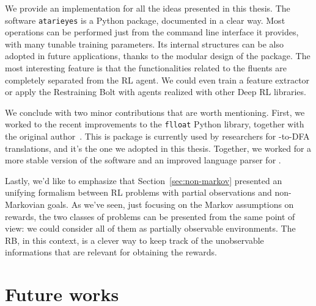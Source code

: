 \begin{description}[style=nextline]
	\item[The \texttt{atarieyes} package]
		We provide an implementation for all the ideas presented in this thesis.
		The software \texttt{atarieyes} is a Python package, documented in a clear
		way.  Most operations can be performed just from the command line
		interface it provides, with many tunable training parameters. Its internal
		structures can be also adopted in future applications, thanks to the
		modular design of the package. The most interesting feature is that the
		functionalities related to the fluents are completely separated from the
		RL agent. We could even train a feature extractor or apply the Restraining
		Bolt with agents realized with other Deep RL libraries.

\end{description}

We conclude with two minor contributions that are worth mentioning. First, we
worked to the recent improvements to the \texttt{flloat} Python library,
together with the original author~\cite{bib:favorito-thesis}. This is package
is currently used by researchers for \ldl{}-to-DFA translations, and it's the
one we adopted in this thesis. Together, we worked for a more stable version
of the software and an improved language parser for \ldl{}.

Lastly, we'd like to emphasize that Section~\ref{sec:non-markov} presented an
unifying formalism between RL problems with partial observations and
non-Markovian goals. As we've seen, just focusing on the Markov assumptions on
rewards, the two classes of problems can be presented from the same point of
view: we could consider all of them as partially observable environments. The
RB, in this context, is a clever way to keep track of the unobservable
informations that are relevant for obtaining the rewards.


\section{Future works}

\label{sec:future}

